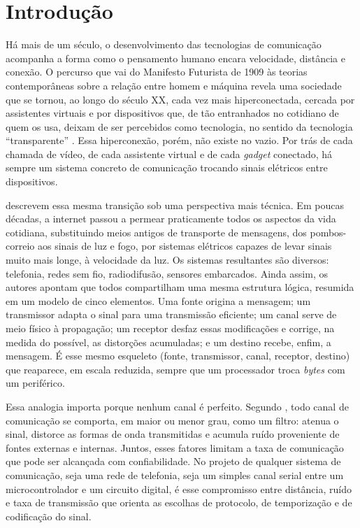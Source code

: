 \documentclass[
	12pt,
	oneside,
	a4paper,
	english,
	french,
	spanish,
	brazil,
	]{abntex2}
\begin{document}
\chapter{Introdução}

Há mais de um século, o desenvolvimento das tecnologias de comunicação acompanha a forma como o pensamento humano encara velocidade, distância e conexão. O percurso que vai do Manifesto Futurista de 1909 às teorias contemporâneas sobre a relação entre homem e máquina revela uma sociedade que se tornou, ao longo do século XX, cada vez mais hiperconectada, cercada por assistentes virtuais e por dispositivos que, de tão entranhados no cotidiano de quem os usa, deixam de ser percebidos como tecnologia, no sentido da tecnologia ``transparente'' \cite{lopes_pernisa2022}. Essa hiperconexão, porém, não existe no vazio. Por trás de cada chamada de vídeo, de cada assistente virtual e de cada \emph{gadget} conectado, há sempre um sistema concreto de comunicação trocando sinais elétricos entre dispositivos.

 descrevem essa mesma transição sob uma perspectiva mais técnica. Em poucas décadas, a internet passou a permear praticamente todos os aspectos da vida cotidiana, substituindo meios antigos de transporte de mensagens, dos pombos-correio aos sinais de luz e fogo, por sistemas elétricos capazes de levar sinais muito mais longe, à velocidade da luz. Os sistemas resultantes são diversos: telefonia, redes sem fio, radiodifusão, sensores embarcados. Ainda assim, os autores apontam que todos compartilham uma mesma estrutura lógica, resumida em um modelo de cinco elementos. Uma fonte origina a mensagem; um transmissor adapta o sinal para uma transmissão eficiente; um canal serve de meio físico à propagação; um receptor desfaz essas modificações e corrige, na medida do possível, as distorções acumuladas; e um destino recebe, enfim, a mensagem. É esse mesmo esqueleto (fonte, transmissor, canal, receptor, destino) que reaparece, em escala reduzida, sempre que um processador troca \emph{bytes} com um periférico.

Essa analogia importa porque nenhum canal é perfeito. Segundo , todo canal de comunicação se comporta, em maior ou menor grau, como um filtro: atenua o sinal, distorce as formas de onda transmitidas e acumula ruído proveniente de fontes externas e internas. Juntos, esses fatores limitam a taxa de comunicação que pode ser alcançada com confiabilidade. No projeto de qualquer sistema de comunicação, seja uma rede de telefonia, seja um simples canal serial entre um microcontrolador e um circuito digital, é esse compromisso entre distância, ruído e taxa de transmissão que orienta as escolhas de protocolo, de temporização e de codificação do sinal.
\end{document}
